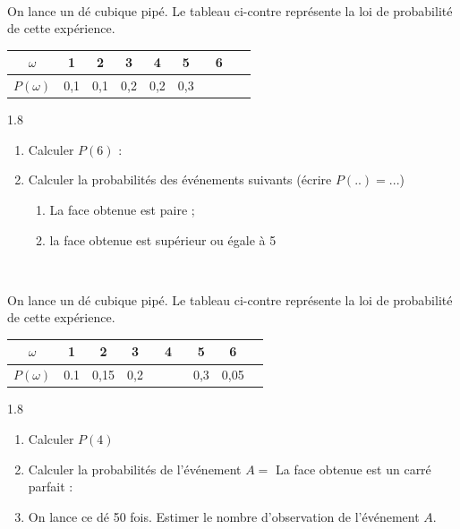\documentclass[main.tex]{subfiles}
\begin{document}
\begin{exercise}  \hfill \\ 
	\noindent\parbox{0.52\linewidth}{ 
		On lance un dé cubique pipé. Le tableau ci-contre  représente la loi de probabilité de cette expérience.
	}	
	\parbox{0.46\linewidth}{ \centering
		\renewcommand{\arraystretch}{1.5} 
		\begin{tabular}{|c|c|c|c|c|c|c|c|}
			\hline
			$\omega$&1&2&3&4&5&6\\\hline
			$P(\omega)$&0,1&0,1&0,2&0,2&0,3&$\qquad$\\\hline
		\end{tabular} 
	}   
\vspace{0.5em}
\begin{spacing}{1.8}
\begin{enumerate}[label=\arabic*), leftmargin=*]
	\item Calculer $P(6)$ : \dotfill 
	\item Calculer la probabilités des événements suivants (écrire   $P(..)=$...)  
	\begin{enumerate} [label={$\Alph*=$},leftmargin=*]
		\item \og La face obtenue est paire \fg{};\dotfill 
		\item \og la face obtenue est supérieur ou égale à 5 \fg{}\dotfill 
	\end{enumerate}
\vspace{-1.5em}
\end{enumerate} 
\end{spacing}
\end{exercise}
\begin{exercise}\hfill \\ 
	\noindent\parbox{0.52\linewidth}{ 
		On lance un dé cubique pipé. Le tableau ci-contre  représente la loi de probabilité de cette expérience.
	}	
	\parbox{0.46\linewidth}{ \centering
		\renewcommand{\arraystretch}{1.5} 
		\begin{tabular}{|c|c|c|c|c|c|c|c|}
			\hline
			$\omega$&1&2&3&4&5&6\\\hline
			$P(\omega)$&0.1&0,15&0,2&$\qquad$&0,3&0,05\\\hline
		\end{tabular} 
	}  
\vspace{0.5em}
\begin{spacing}{1.8}
	\begin{enumerate}[label=\arabic*), leftmargin=*]
		\item Calculer $P(4)$\dotfill 
		\item Calculer la probabilités de l'événement $A=$ \og La face obtenue est un carré parfait \fg :\\
		\null\dotfill\null 
		\item On lance ce dé 50 fois. Estimer le nombre d'observation de l'événement $A$. \\
		\null\dotfill\null  
	\end{enumerate} 
\vspace{-1.5em}
\end{spacing}
\end{exercise}
\end{document}

